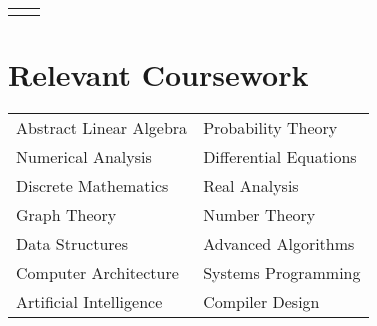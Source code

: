 \documentclass[10pt, oneside, openany]{article} %
\begin{document}
\begin{paracol}{2}
\begin{supertabular}{ll}
	
	
\end{supertabular}


\section{Relevant Coursework}

\begin{tabular}{l l}
Abstract Linear Algebra & Probability Theory\\
Numerical Analysis & Differential Equations\\
Discrete Mathematics & Real Analysis\\
Graph Theory & Number Theory\\
Data Structures & Advanced Algorithms\\
Computer Architecture & Systems Programming\\
Artificial Intelligence & Compiler Design\\
\end{tabular}





\vspace{-\baselineskip}\medskip %

\switchcolumn %



\end{paracol}
\end{document}
